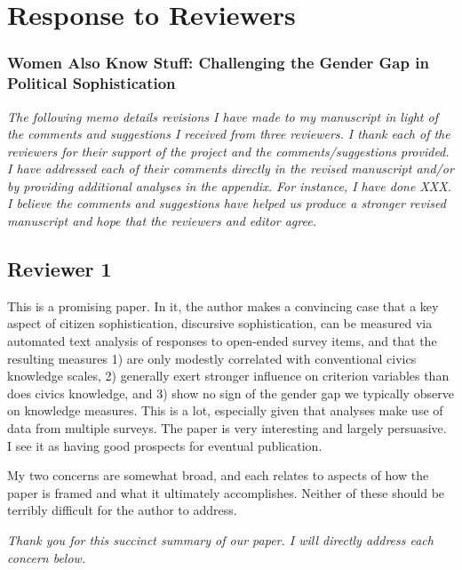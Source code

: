 \clearpage
\singlespacing
\setcounter{page}{1}
\setcounter{footnote}{0}
\setlength{\parskip}{1em}
\setlength{\parindent}{0cm}
\section*{Response to Reviewers}
\subsubsection*{Women Also Know Stuff: Challenging the Gender Gap in Political Sophistication}
\startcontents[memo]

\textit{The following memo details revisions I have made to my manuscript in light of the comments and suggestions I received from three reviewers.  I thank each of the reviewers for their support of the project and the comments/suggestions provided. I have addressed each of their comments directly in the revised manuscript and/or by providing additional analyses in the appendix.  For instance, I have done XXX. I believe the comments and suggestions have helped us produce a stronger revised manuscript and hope that the reviewers and editor agree.}


\subsection*{Reviewer 1}

This is a promising paper. In it, the author makes a convincing case that a key aspect of citizen sophistication, discursive sophistication, can be measured via automated text analysis of responses to open-ended survey items, and that the resulting measures 1) are only modestly correlated with conventional civics knowledge scales, 2) generally exert stronger influence on criterion variables than does civics knowledge, and 3) show no sign of the gender gap we typically observe on knowledge measures. This is a lot, especially given that analyses make use of data from multiple surveys. The paper is very interesting and largely persuasive. I see it as having good prospects for eventual publication.

My two concerns are somewhat broad, and each relates to aspects of how the paper is framed and what it ultimately accomplishes. Neither of these should be terribly difficult for the author to address.

\textit{Thank you for this succinct summary of our paper. I will directly address each concern below.}


